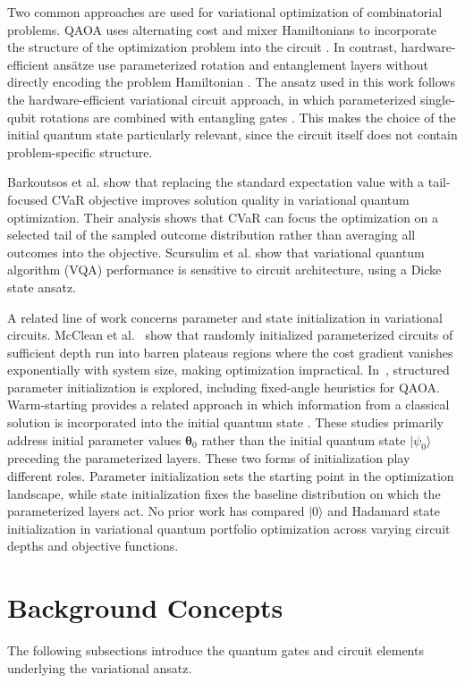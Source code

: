 \documentclass[runningheads]{llncs}
\begin{document}
Two common approaches are used for variational optimization of combinatorial problems. QAOA uses alternating cost and mixer Hamiltonians to incorporate the structure of the optimization problem into the circuit \cite{zhou2020qaoa}. In contrast, hardware-efficient ans\"atze use parameterized rotation and entanglement layers without directly encoding the problem Hamiltonian \cite{kandala2017hardware}. The ansatz used in this work follows the hardware-efficient variational circuit approach, in which parameterized single-qubit rotations are combined with entangling gates \cite{kandala2017hardware}. This makes the choice of the initial quantum state particularly relevant, since the circuit itself does not contain problem-specific structure.

Barkoutsos et al. \cite{barkoutsos2020} show that replacing the standard expectation value with a tail-focused CVaR objective improves solution quality in variational quantum optimization. Their analysis shows that CVaR can focus the optimization on a selected tail of the sampled outcome distribution rather than averaging all outcomes into the objective. Scursulim et al. \cite{scursulim2026} show that variational quantum algorithm (VQA) performance is sensitive to circuit architecture, using a Dicke state ansatz.

A related line of work concerns parameter and state initialization in variational circuits. McClean et al.~\cite{mcclean2018barren} show that randomly initialized parameterized circuits of sufficient depth run into barren plateaus regions where the cost gradient vanishes exponentially with system size, making optimization impractical. In~\cite{Wurtz_2021_fixed_angle}, structured parameter initialization is explored, including fixed-angle heuristics for QAOA. Warm-starting provides a related approach in which information from a classical solution is incorporated into the initial quantum state \cite{egger2021warmstart}. These studies primarily address initial parameter values $\boldsymbol{\theta}_0$ rather than the initial quantum state $|\psi_0\rangle$ preceding the parameterized layers. These two forms of initialization play different roles. Parameter initialization sets the starting point in the optimization landscape, while state initialization fixes the baseline distribution on which the parameterized layers act. No prior work has compared $|0\rangle$ and Hadamard state initialization in variational quantum portfolio optimization across varying circuit depths and objective functions.
\section{Background Concepts}\label{background}
The following subsections introduce the quantum gates and circuit elements underlying the variational ansatz.
\end{document}
